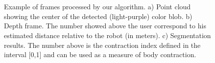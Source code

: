 \begin{figure}[h]
  \centering 
  \begin{subfigure}[b]{0.3\textwidth}
		\centering
		\caption{}
  \end{subfigure}
  ~
  \begin{subfigure}[b]{0.3\textwidth}
		\centering
		\caption{}
  \end{subfigure}
  ~
  \begin{subfigure}[b]{0.3\textwidth}
		\centering
		\caption{}
  \end{subfigure}
  \caption{Example of frames processed by our algorithm. a) Point cloud showing the center of the detected (light-purple) color blob. b) Depth frame. The number showed above the user correspond to his estimated distance relative to the robot (in meters). c) Segmentation results. The number above is the contraction index defined in the interval [0,1] and can be used as a measure of body contraction.}\label{fig:segmenta}
   \label{segmentacao}
\end{figure}